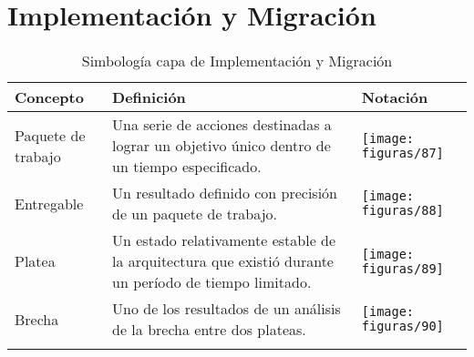 \section{Implementación y Migración}
  \begin{longtable}
  	{m{3cm}m{4.8cm}m{5.2cm}}
  	\hline
  	\rowcolor[HTML]{0073a1}
  	{\color[HTML]{FFFFFF} \textbf{Concepto}} & {\color[HTML]{FFFFFF} \textbf{Definición}} & {\color[HTML]{FFFFFF} \textbf{Notación}} \\
  	\hline
	Paquete de trabajo & Una serie de acciones destinadas a lograr un objetivo único dentro de un tiempo especificado. & \texttt{[image: figuras/87]} \\ \hline
	Entregable & Un resultado definido con precisión de un paquete de trabajo. & \texttt{[image: figuras/88]} \\ \hline
	Platea & Un estado relativamente estable de la arquitectura que existió durante un período de tiempo limitado. & \texttt{[image: figuras/89]} \\ \hline
	Brecha & Uno de los resultados de un análisis de la brecha entre dos plateas. & \texttt{[image: figuras/90]} \\
	\bottomrule
	\captionsetup{width=.95\textwidth}
	\caption{Simbología\index{Simbología} capa de Implementación\index{Implementación} y Migración\index{Migración} \cite{ref9}}
	\label{tabla36}
  \end{longtable}
  
%